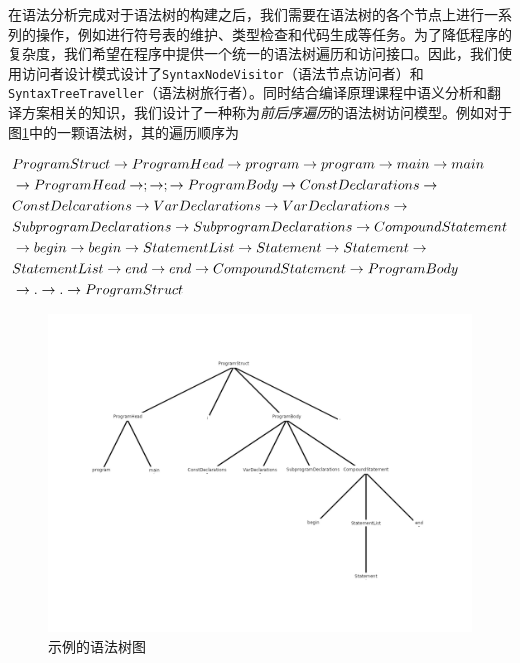 \documentclass[../main.tex]{subfiles}
\begin{document}
在语法分析完成对于语法树的构建之后，我们需要在语法树的各个节点上进行一系列的操作，例如进行符号表的维护、类型检查和代码生成等任务。为了降低程序的复杂度，我们希望在程序中提供一个统一的语法树遍历和访问接口。因此，我们使用访问者设计模式设计了\texttt{SyntaxNodeVisitor}（语法节点访问者）和\texttt{SyntaxTreeTraveller}（语法树旅行者）。同时结合编译原理课程中语义分析和翻译方案相关的知识，我们设计了一种称为\textit{前后序遍历}的语法树访问模型。例如对于图\ref{fig:syntax_tree_example}中的一颗语法树，其的遍历顺序为

\begin{align}\notag
& ProgramStruct \to ProgramHead \to program \to program \to main \to main \\ \notag
&\to ProgramHead \to ; \to ; \to ProgramBody \to ConstDeclarations \to \\ \notag
&ConstDelcarations \to VarDeclarations \to VarDeclarations \to \\ \notag
&SubprogramDeclarations \to SubprogramDeclarations \to CompoundStatement \\ \notag
&\to begin \to begin \to StatementList \to Statement \to Statement \to \\ \notag
&StatementList \to end \to end \to CompoundStatement \to ProgramBody \\ \notag
&\to . \to . \to ProgramStruct \notag
\end{align}

\begin{figure}[t]
    \centering
    \includegraphics[width=0.9\linewidth]{assets/示例语法树图.png}
    \caption{示例的语法树图}
    \label{fig:syntax_tree_example}
\end{figure}
\end{document}
